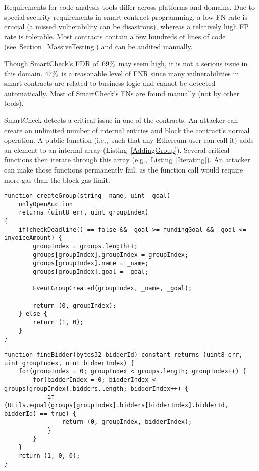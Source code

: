Requirements for code analysis tools differ across platforms and domains.
Due to special security requirements in smart contract programming, a low FN rate is crucial (a missed vulnerability can be disastrous), whereas a relatively high FP rate is tolerable.
Most contracts contain a few hundreds of lines of code (see~Section~\ref{MassiveTesting}) and can be audited manually.

Though SmartCheck's FDR of~$69\%$~may seem high, it is not a serious issue in this domain.
$47\%$~is a reasonable level of FNR since many vulnerabilities in smart contracts are related to business logic and cannot be detected automatically.
Most of SmartCheck's FNs are found manually (not by other tools).

SmartCheck detects a critical issue in one of the contracts.
An attacker can create an unlimited number of internal entities and block the contract's normal operation.
A public function (i.e.,~such that any Ethereum user can call it) adds an element to an internal array (Listing~\ref{AddingGroup}).
Several critical functions then iterate through this array (e.g.,~Listing~\ref{Iterating}).
An attacker can make those functions permanently fail, as the function call would require more gas than the block gas limit.

\begin{minipage}{\linewidth} 
\begin{lstlisting}[caption={Adding an element to an internal array.},label={AddingGroup},language=Solidity]
function createGroup(string _name, uint _goal)
    onlyOpenAuction
    returns (uint8 err, uint groupIndex)
{
	if(checkDeadline() == false && _goal >= fundingGoal && _goal <= invoiceAmount) {
		groupIndex = groups.length++;
		groups[groupIndex].groupIndex = groupIndex;
		groups[groupIndex].name = _name;
		groups[groupIndex].goal = _goal;

		EventGroupCreated(groupIndex, _name, _goal);

		return (0, groupIndex);
	} else {
		return (1, 0);
	}
}
\end{lstlisting}
\end{minipage}

\begin{minipage}{\linewidth}
\begin{lstlisting}[caption={Iterating through an internal array.},label={Iterating},language=Solidity]
function findBidder(bytes32 bidderId) constant returns (uint8 err, uint groupIndex, uint bidderIndex) {
	for(groupIndex = 0; groupIndex < groups.length; groupIndex++) {
		for(bidderIndex = 0; bidderIndex < groups[groupIndex].bidders.length; bidderIndex++) {
			if (Utils.equal(groups[groupIndex].bidders[bidderIndex].bidderId, bidderId) == true) {
				return (0, groupIndex, bidderIndex);
			}
		}
	}
	return (1, 0, 0);
}
\end{lstlisting}
\end{minipage}

